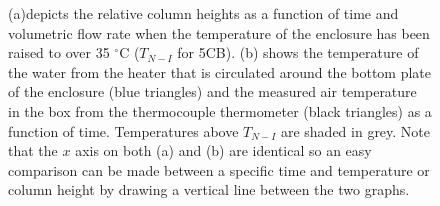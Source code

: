 \begin{figure}
\begin{center}
\end{center}
\caption[Column heights in the isotropic phase (left to right)]{\label{fig:isotropic_left_to_right}(a)depicts the relative column heights as a function of time and volumetric flow rate when the temperature of the enclosure has been raised to over 35 $^{\circ}\text{C}$ ($T_{N-I}$ for 5CB). (b) shows the temperature of the water from the heater that is circulated around the bottom plate of the enclosure (blue triangles) and the measured air temperature in the box from the thermocouple thermometer (black triangles) as a function of time. Temperatures above $T_{N-I}$ are shaded in grey. Note that the $x$ axis on both (a) and (b) are identical so an easy comparison can be made between a specific time and temperature or column height by drawing a vertical line between the two graphs.}
\end{figure}

